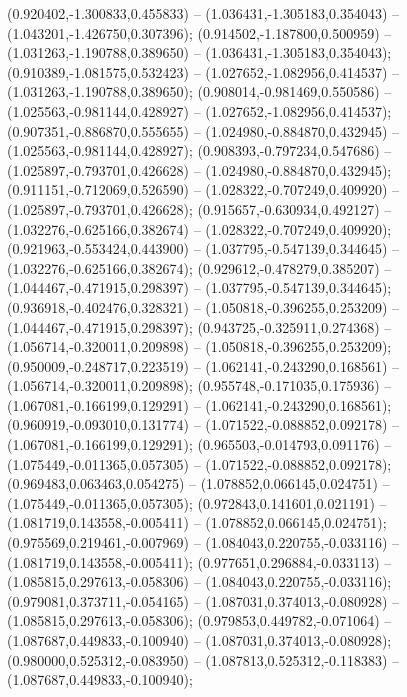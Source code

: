  (0.920402,-1.300833,0.455833) -- (1.036431,-1.305183,0.354043) -- (1.043201,-1.426750,0.307396);
 (0.914502,-1.187800,0.500959) -- (1.031263,-1.190788,0.389650) -- (1.036431,-1.305183,0.354043);
 (0.910389,-1.081575,0.532423) -- (1.027652,-1.082956,0.414537) -- (1.031263,-1.190788,0.389650);
 (0.908014,-0.981469,0.550586) -- (1.025563,-0.981144,0.428927) -- (1.027652,-1.082956,0.414537);
 (0.907351,-0.886870,0.555655) -- (1.024980,-0.884870,0.432945) -- (1.025563,-0.981144,0.428927);
 (0.908393,-0.797234,0.547686) -- (1.025897,-0.793701,0.426628) -- (1.024980,-0.884870,0.432945);
 (0.911151,-0.712069,0.526590) -- (1.028322,-0.707249,0.409920) -- (1.025897,-0.793701,0.426628);
 (0.915657,-0.630934,0.492127) -- (1.032276,-0.625166,0.382674) -- (1.028322,-0.707249,0.409920);
 (0.921963,-0.553424,0.443900) -- (1.037795,-0.547139,0.344645) -- (1.032276,-0.625166,0.382674);
 (0.929612,-0.478279,0.385207) -- (1.044467,-0.471915,0.298397) -- (1.037795,-0.547139,0.344645);
 (0.936918,-0.402476,0.328321) -- (1.050818,-0.396255,0.253209) -- (1.044467,-0.471915,0.298397);
 (0.943725,-0.325911,0.274368) -- (1.056714,-0.320011,0.209898) -- (1.050818,-0.396255,0.253209);
 (0.950009,-0.248717,0.223519) -- (1.062141,-0.243290,0.168561) -- (1.056714,-0.320011,0.209898);
 (0.955748,-0.171035,0.175936) -- (1.067081,-0.166199,0.129291) -- (1.062141,-0.243290,0.168561);
 (0.960919,-0.093010,0.131774) -- (1.071522,-0.088852,0.092178) -- (1.067081,-0.166199,0.129291);
 (0.965503,-0.014793,0.091176) -- (1.075449,-0.011365,0.057305) -- (1.071522,-0.088852,0.092178);
 (0.969483,0.063463,0.054275) -- (1.078852,0.066145,0.024751) -- (1.075449,-0.011365,0.057305);
 (0.972843,0.141601,0.021191) -- (1.081719,0.143558,-0.005411) -- (1.078852,0.066145,0.024751);
 (0.975569,0.219461,-0.007969) -- (1.084043,0.220755,-0.033116) -- (1.081719,0.143558,-0.005411);
 (0.977651,0.296884,-0.033113) -- (1.085815,0.297613,-0.058306) -- (1.084043,0.220755,-0.033116);
 (0.979081,0.373711,-0.054165) -- (1.087031,0.374013,-0.080928) -- (1.085815,0.297613,-0.058306);
 (0.979853,0.449782,-0.071064) -- (1.087687,0.449833,-0.100940) -- (1.087031,0.374013,-0.080928);
 (0.980000,0.525312,-0.083950) -- (1.087813,0.525312,-0.118383) -- (1.087687,0.449833,-0.100940);
